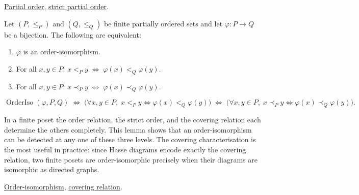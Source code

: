 \begin{remark*}[Dependencies]
\hyperref[def:partial-order]{Partial order},
\hyperref[def:strict-partial-order]{strict partial order}.
\end{remark*}


\begin{lemma}
\label{lem:order-iso-finite-characterizations}
Let $(P, \leq_P)$ and $(Q, \leq_Q)$ be finite partially ordered sets and
let $\varphi : P \to Q$ be a bijection.  The following are equivalent:
\begin{enumerate}
  \item $\varphi$ is an order-isomorphism.
  \item For all $x, y \in P$:\; $x <_P y \;\Longleftrightarrow\; \varphi(x) <_Q \varphi(y)$.
  \item For all $x, y \in P$:\; $x \prec_P y \;\Longleftrightarrow\; \varphi(x) \prec_Q \varphi(y)$.
\end{enumerate}
\end{lemma}

\begin{remark*}
\[
\operatorname{OrderIso}(\varphi, P, Q)
\;\Longleftrightarrow\;
\bigl(\forall x,y \in P,\; x <_P y \Leftrightarrow \varphi(x) <_Q \varphi(y)\bigr)
\;\Longleftrightarrow\;
\bigl(\forall x,y \in P,\; x \prec_P y \Leftrightarrow \varphi(x) \prec_Q \varphi(y)\bigr).
\]
\end{remark*}

\begin{remark*}[Interpretation]
In a finite poset the order relation, the strict order, and the covering
relation each determine the others completely.  This lemma shows that an
order-isomorphism can be detected at any one of these three levels.  The
covering characterisation is the most useful in practice: since Hasse
diagrams encode exactly the covering relation, two finite posets are
order-isomorphic precisely when their diagrams are isomorphic as directed
graphs.
\end{remark*}

\begin{remark*}[Dependencies]
\hyperref[def:order-isomorphism]{Order-isomorphism},
\hyperref[def:covering-relation]{covering relation}.
\end{remark*}

